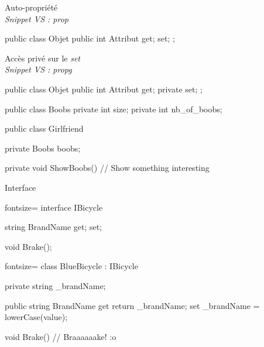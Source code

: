 \begin{frame}[fragile]
    \begin{center}
        {\large Auto-propriété}\\
        \emph{\scriptsize Snippet VS : prop}
    \end{center}
    \begin{csharpcode}
public class Objet
{
    public int Attribut { get; set; };
}
    \end{csharpcode}
    \pause
    \begin{center}
        {\large Accès privé sur le \emph{set}}\\
        \emph{\scriptsize Snippet VS : propg}
    \end{center}
    \begin{csharpcode}
public class Objet
{
    public int Attribut { get; private set; };
}
    \end{csharpcode}
\end{frame}

\begin{frame}[fragile]
  \begin{csharpcode}
public class Boobs
{
    private int size;
    private int nb_of_boobs;
}
  \end{csharpcode}
  \pause
  \begin{csharpcode}
public class Girlfriend
{
    private Boobs boobs;

    private void ShowBoobs()
    {
        // Show something interesting
    }
}
  \end{csharpcode}
\end{frame}

\begin{frame}[fragile]
    \begin{center}{\large Interface}\end{center}
    \begin{csharpcode*}{fontsize=\scriptsize}
interface IBicycle
{
     string BrandName { get; set; }

     void Brake();
}
    \end{csharpcode*}
    \pause
    \begin{csharpcode*}{fontsize=\scriptsize}
class BlueBicycle : IBicycle
{
    private string _brandName;

    public string BrandName {
        get { return _brandName; }
        set { _brandName = lowerCase(value); }
    }

    void Brake() {
        // Braaaaaake! :o
    }
}
    \end{csharpcode*}
\end{frame}

